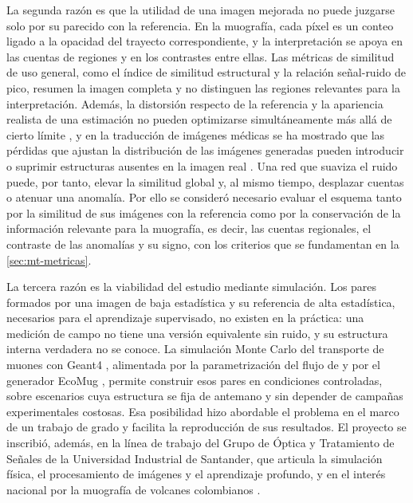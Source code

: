 La segunda razón es que la utilidad de una imagen mejorada no puede juzgarse solo por su parecido con la referencia. En la muografía, cada píxel es un conteo ligado a la opacidad del trayecto correspondiente, y la interpretación se apoya en las cuentas de regiones y en los contrastes entre ellas. Las métricas de similitud de uso general, como el índice de similitud estructural y la relación señal-ruido de pico, resumen la imagen completa y no distinguen las regiones relevantes para la interpretación. Además, la distorsión respecto de la referencia y la apariencia realista de una estimación no pueden optimizarse simultáneamente más allá de cierto límite \parencite{blau2018}, y en la traducción de imágenes médicas se ha mostrado que las pérdidas que ajustan la distribución de las imágenes generadas pueden introducir o suprimir estructuras ausentes en la imagen real \parencite{cohen2018}. Una red que suaviza el ruido puede, por tanto, elevar la similitud global y, al mismo tiempo, desplazar cuentas o atenuar una anomalía. Por ello se consideró necesario evaluar el esquema tanto por la similitud de sus imágenes con la referencia como por la conservación de la información relevante para la muografía, es decir, las cuentas regionales, el contraste de las anomalías y su signo, con los criterios que se fundamentan en la \cref{sec:mt-metricas}.

La tercera razón es la viabilidad del estudio mediante simulación. Los pares formados por una imagen de baja estadística y su referencia de alta estadística, necesarios para el aprendizaje supervisado, no existen en la práctica: una medición de campo no tiene una versión equivalente sin ruido, y su estructura interna verdadera no se conoce. La simulación Monte Carlo del transporte de muones con Geant4 \parencite{agostinelli2003,allison2016}, alimentada por la parametrización del flujo de \textcite{guan2015muonflux} y por el generador EcoMug \parencite{pagano2021}, permite construir esos pares en condiciones controladas, sobre escenarios cuya estructura se fija de antemano y sin depender de campañas experimentales costosas. Esa posibilidad hizo abordable el problema en el marco de un trabajo de grado y facilita la reproducción de sus resultados. El proyecto se inscribió, además, en la línea de trabajo del Grupo de Óptica y Tratamiento de Señales de la Universidad Industrial de Santander, que articula la simulación física, el procesamiento de imágenes y el aprendizaje profundo, y en el interés nacional por la muografía de volcanes colombianos \parencite{penarodriguez2020}.

